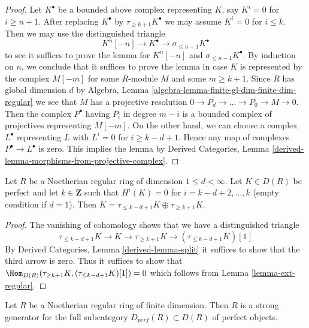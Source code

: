 \begin{proof}
Let $K^\bullet$ be a bounded above complex representing $K$, say
$K^i = 0$ for $i \geq n + 1$. After replacing $K^\bullet$ by
$\tau_{\geq k + 1}K^\bullet$ we may assume $K^i = 0$ for $i \leq k$.
Then we may use the distinguished triangle
$$
K^n[-n] \to K^\bullet \to \sigma_{\leq n - 1}K^\bullet
$$
to see it suffices to prove the lemma for $K^n[-n]$ and
$\sigma_{\leq n - 1}K^\bullet$. By induction on $n$, we conclude
that it suffices to prove the lemma in case $K$ is represented by
the complex $M[-m]$ for some $R$-module $M$ and some $m \geq k + 1$.
Since $R$ has global dimension $d$ by Algebra, Lemma
\ref{algebra-lemma-finite-gl-dim-finite-dim-regular}
we see that $M$ has a projective resolution
$0 \to P_d \to \ldots \to P_0 \to M \to 0$.
Then the complex $P^\bullet$ having $P_i$ in degree $m - i$
is a bounded complex of projectives representing $M[-m]$.
On the other hand, we can choose a complex $L^\bullet$ representing
$L$ with $L^i = 0$ for $i \geq k - d  + 1$.
Hence any map of complexes $P^\bullet \to L^\bullet$ is zero.
This implies the lemma by Derived Categories, Lemma
\ref{derived-lemma-morphisms-from-projective-complex}.
\end{proof}

\begin{lemma}
\label{lemma-split-complex-regular}
Let $R$ be a Noetherian regular ring of dimension $1 \leq d < \infty$.
Let $K \in D(R)$ be perfect and let $k \in \mathbf{Z}$ such that
$H^i(K) = 0$ for $i = k - d + 2, \ldots, k$ (empty condition if $d = 1$).
Then $K = \tau_{\leq k - d + 1}K \oplus \tau_{\geq k + 1}K$.
\end{lemma}

\begin{proof}
The vanishing of cohomology shows that we have a distinguished triangle
$$
\tau_{\leq k - d + 1}K \to K \to \tau_{\geq k + 1}K \to
(\tau_{\leq k - d + 1}K)[1]
$$
By Derived Categories, Lemma \ref{derived-lemma-split} it suffices to show that
the third arrow is zero. Thus it suffices to show that
$\Hom_{D(R)}(\tau_{\geq k + 1}K, (\tau_{\leq k - d + 1}K)[1]) = 0$
which follows from Lemma \ref{lemma-ext-regular}.
\end{proof}

\begin{lemma}
\label{lemma-regular-strong-generator}
Let $R$ be a Noetherian regular ring of finite dimension.
Then $R$ is a strong generator for the full subcategory
$D_{perf}(R) \subset D(R)$ of perfect objects.
\end{lemma}

